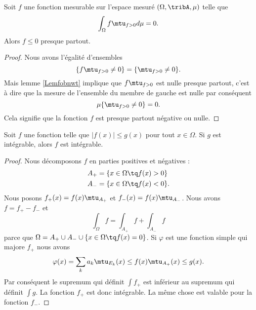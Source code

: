 \begin{corollary}   \label{CorjLYiSm}
    Soit \( f\) une fonction mesurable sur l'espace mesuré \( (\Omega,\tribA,\mu)\) telle que
    \begin{equation}
        \int_{\Omega}f\mtu_{f>0}d\mu=0.
    \end{equation}
    Alors \( f\leq 0\) presque partout.
\end{corollary}

\begin{proof}
    Nous avons l'égalité d'ensembles
    \begin{equation}
        \{ f\mtu_{f>0}\neq 0 \}=\{ \mtu_{f>0}\neq 0 \}.
    \end{equation}
    Mais lemme \ref{Lemfobnwt} implique que \( f\mtu_{f>0}\) est nulle presque partout, c'est à dire que la mesure de l'ensemble du membre de gauche est nulle par conséquent
    \begin{equation}
        \mu\{ \mtu_{f>0}\neq 0 \}=0.
    \end{equation}
    Cela signifie que la fonction \( f\) est presque partout négative ou nulle.
\end{proof}

\begin{lemma}   \label{LemPfHgal}
    Soit \( f\) une fonction telle que \( | f(x)|\leq g(x) \) pour tout \( x\in\Omega\). Si \( g\) est intégrable, alors \( f\) est intégrable.
\end{lemma}

\begin{proof}
    Nous décomposons \( f\) en parties positives et négatives :
    \begin{subequations}
        \begin{align}
            A_+&=\{ x\in\Omega\tq f(x)>0 \}\\
            A_-&=\{ x\in\Omega\tq f(x)<0 \}.
        \end{align}
    \end{subequations}
    Nous posons \( f_+(x)=f(x)\mtu_{A_+}\) et \( f_-(x)=f(x)\mtu_{A_-}\). Nous avons \( f=f_+-f_-\) et
    \begin{equation}
        \int_{\Omega}f=\int_{A_+}f+\int_{A_-}f
    \end{equation}
    parce que \( \Omega=A_+\cup A_-\cup\{ x\in\Omega\tq f(x)=0 \}\). Si \( \varphi\) est une fonction simple qui majore \( f_+\) nous avons
    \begin{equation}
        \varphi(x)=\sum_{k}a_k\mtu_{E_k}(x)\leq f(x)\mtu_{A_+}(x)\leq g(x).
    \end{equation}
    Par conséquent le supremum qui définit \( \int f_+\) est inférieur au supremum qui définit \( \int g\). La fonction \( f_+\) est donc intégrable. La même chose est valable pour la fonction \( f_-\).
\end{proof}

